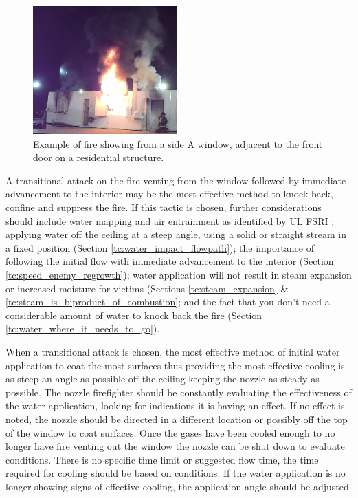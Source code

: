\documentclass[12pt,oneside]{book}
\begin{document}
\begin{figure}[H]
\centering
\includegraphics[width=0.495\textwidth]{../0_Images/Tactical_Considerations/Transitional_Attack/SIDE_A}
\caption[Example - Fire Showing - Side A]{Example of fire showing from a side A window, adjacent to the front door on a residential structure.}
\label{fig:transitional_attack_TC_fire_showing}
\end{figure}

A transitional attack on the fire venting from the window followed by immediate advancement to the interior may be the most effective method to knock back, confine and suppress the fire. If this tactic is chosen, further considerations should include water mapping and air entrainment as identified by UL FSRI \cite{Weinchenk_watermapping} \cite{Weinchenk_airentrainment}; applying water off the ceiling at a steep angle, using a solid or straight stream in a fixed position (Section \ref{tc:water_impact_flowpath}); the importance of following the initial flow with immediate advancement to the interior (Section \ref{tc:speed_enemy_regrowth}); water application will not result in steam expansion or increased moisture for victims (Sections \ref{tc:steam_expansion} \& \ref{tc:steam_is_biproduct_of_combustion}; and the fact that you don't need a considerable amount of water to knock back the fire (Section \ref{tc:water_where_it_needs_to_go}).

When a transitional attack is chosen, the most effective method of initial water application to coat the most surfaces thus providing the most effective cooling is as steep an angle as possible off the ceiling keeping the nozzle as steady as possible. The nozzle firefighter should be constantly evaluating the effectiveness of the water application, looking for indications it is having an effect. If no effect is noted, the nozzle should be directed in a different location or possibly off the top of the window to coat surfaces. Once the gases have been cooled enough to no longer have fire venting out the window the nozzle can be shut down to evaluate conditions. There is no specific time limit or suggested flow time, the time required for cooling should be based on conditions. If the water application is no longer showing signs of effective cooling, the application angle should be adjusted. 
\end{document}
